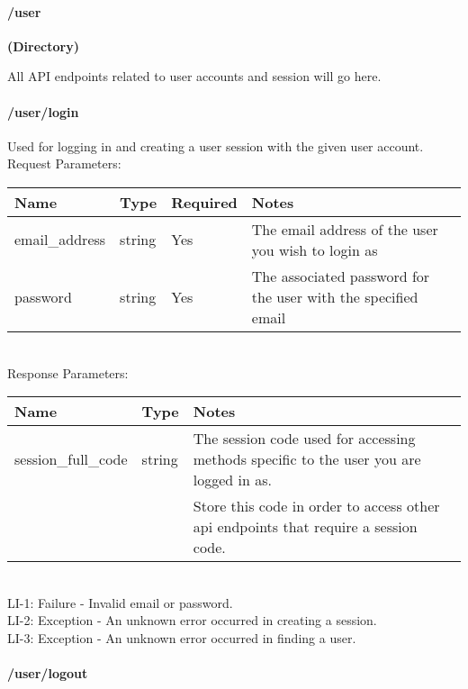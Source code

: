 \documentclass{article}[11pt]
\begin{document}
\paragraph{/user}\textbf{ (Directory) }

All API endpoints related to user accounts and session will go here.


\paragraph{/user/login}\textbf{}

Used for logging in and creating a user session with the given user account. \\

\noindent
Request Parameters:

\noindent
\begin{tabular}{|l|l|l|l|}
\hline
\textbf{Name} & \textbf{Type} & \textbf{Required} & \textbf{Notes} \\
\hline
email\_address & string & Yes & The email address of the user you wish to login as \\
\hline
password & string & Yes & The associated password for the user with the specified email \\
\hline
\end{tabular} \\

\noindent
Response Parameters:

\noindent
\begin{tabular}{|l|l|l|}
\hline
\textbf{Name} & \textbf{Type} & \textbf{Notes} \\
\hline
session\_full\_code & string & The session code used for accessing methods specific to the user you are logged in as. \\
& & Store this code in order to access other api endpoints that require a session code. \\
\hline
\end{tabular} \\

\ErrorsMysql
LI-1: Failure - Invalid email or password. \\
LI-2: Exception - An unknown error occurred in creating a session. \\
LI-3: Exception - An unknown error occurred in finding a user.



\paragraph{/user/logout}\textbf{}
\end{document}
